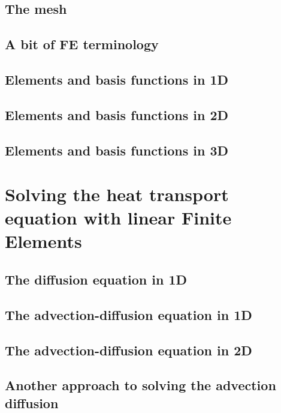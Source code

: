 \documentclass[a4paper]{article}
\numberwithin{equation}{section}
\begin{document}
\subsection{The mesh}
\subsection{A bit of FE terminology}  %
\subsection{Elements and basis functions in 1D}\label{sec:elts1D}  %
\subsection{Elements and basis functions in 2D}\label{sec:shpfct2d}  %
\subsection{Elements and basis functions in 3D}  %

\newpage 
\section{Solving the heat transport equation with linear Finite Elements} %
\subsection{The diffusion equation in 1D} \label{sec:diff1D}  %
\subsection{The advection-diffusion equation in 1D} \label{sec:advec-diff1D} %
\subsection{The advection-diffusion equation in 2D} \label{ss:hte_fem} %
\subsection{Another approach to solving the advection diffusion} 
\end{document}
